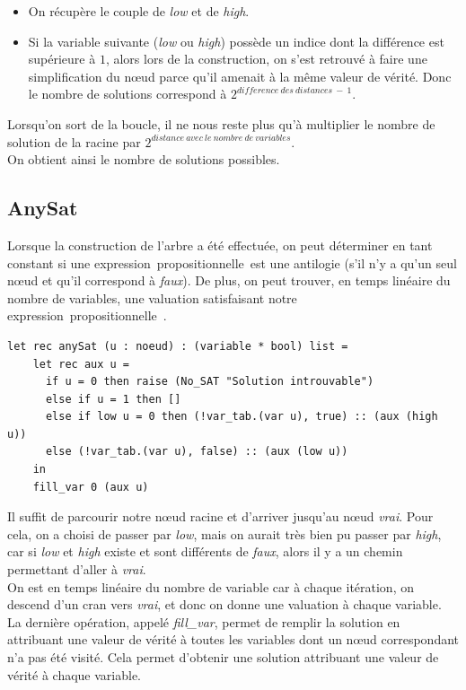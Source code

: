 \documentclass[a4paper, oneside]{report}
\newcommand{\expp}{expression~propositionnelle~}
\begin{document}
\begin{itemize}
\item On récupère le couple de \textit{low} et de \textit{high}.
\item Si la variable suivante (\textit{low} ou \textit{high}) possède un indice dont la différence est supérieure à $1$, alors lors de la construction, on s'est retrouvé à faire une simplification du nœud parce qu'il amenait à la même valeur de vérité. Donc le nombre de solutions correspond à $2^{difference~des~distances~-~1}$.
\end{itemize}
Lorsqu'on sort de la boucle, il ne nous reste plus qu'à multiplier le nombre de solution de la racine par $2^{distance~avec~le~nombre~de~variables}$.\\
On obtient ainsi le nombre de solutions possibles.

\subsection{AnySat}

Lorsque la construction de l'arbre a été effectuée, on peut déterminer en tant constant si une \expp est une antilogie (s'il n'y a qu'un seul nœud et qu'il correspond à \textit{faux}). De plus, on peut trouver, en temps linéaire du nombre de variables, une valuation satisfaisant notre \expp.

\begin{lstlisting}
let rec anySat (u : noeud) : (variable * bool) list =
    let rec aux u = 
      if u = 0 then raise (No_SAT "Solution introuvable")
      else if u = 1 then []
      else if low u = 0 then (!var_tab.(var u), true) :: (aux (high u))
      else (!var_tab.(var u), false) :: (aux (low u))
    in
    fill_var 0 (aux u)
\end{lstlisting}
Il suffit de parcourir notre nœud racine et d'arriver jusqu'au nœud \textit{vrai}. Pour cela, on a choisi de passer par \textit{low}, mais on aurait très bien pu passer par \textit{high}, car si \textit{low} et \textit{high} existe et sont différents de \textit{faux}, alors il y a un chemin permettant d'aller à \textit{vrai}.\\
On est en temps linéaire du nombre de variable car à chaque itération, on descend d'un cran vers \textit{vrai}, et donc on donne une valuation à chaque variable.\\
La dernière opération, appelé \textit{fill\_var}, permet de remplir la solution en attribuant une valeur de vérité à toutes les variables dont un nœud correspondant n'a pas été visité. Cela permet d'obtenir une solution attribuant une valeur de vérité à chaque variable.
\end{document}
